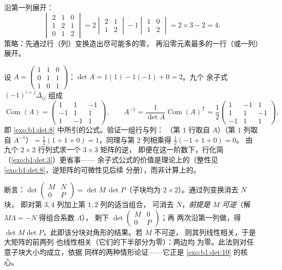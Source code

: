 \begin{example}\label{ex:b1:det:cofactor}
沿第一列展开：
\[
\begin{vmatrix}
2 & 1 & 0\\
1 & 2 & 1\\
0 & 1 & 2
\end{vmatrix}
= 2\begin{vmatrix} 2 & 1\\ 1 & 2\end{vmatrix}
- 1\begin{vmatrix} 1 & 0\\ 1 & 2\end{vmatrix}
= 2 \times 3 - 2 = 4 .
\]
策略：先通过行（列）变换造出尽可能多的零，
再沿零元素最多的一行（或一列）展开。
\end{example}

\begin{example}[手算一次余子式求逆]
\label{ex:b1:det:cofactorinverse}
设 $A = \begin{pmatrix} 1 & 1 & 0\\ 0 & 1 & 1\\ 1 & 0 &
1\end{pmatrix}$：$\det A = 1(1) - 1(-1) + 0 = 2$。九个
余子式 $(-1)^{i+j}\Delta_{ij}$ 组成
\[
\operatorname{Com}(A) = \begin{pmatrix}
1 & 1 & -1\\
-1 & 1 & 1\\
1 & -1 & 1
\end{pmatrix},
\qquad
A^{-1} = \frac{1}{\det A}\operatorname{Com}(A)^{\mathsf T}
= \frac12\begin{pmatrix}
1 & -1 & 1\\
1 & 1 & -1\\
-1 & 1 & 1
\end{pmatrix},
\]
即 \cref{exo:b1:det:8} 中所引的公式。验证一组行与列：
（第 $1$ 行取自 $A$）（第 $1$ 列取自 $A^{-1}$）$= \frac12(1 + 1
+ 0) = 1$，同理与第 $2$ 列相乘得 $\frac12(-1 + 1 + 0) = 0$。
由九个 $2\times2$ 行列式求一个 $3\times3$ 矩阵的逆，
即便在这一阶数下，行化简（\cref{exo:b1:det:3}）更省事——
余子式公式的价值是理论上的（整性见
\cref{exo:b1:det:8}，逆矩阵的可微性见后续
分册），而非计算上的。
\end{example}

\begin{example}[分块三角法则（$4$ 阶）]
\label{ex:b1:det:blocktriangular}
断言：$\det\begin{pmatrix} M & N\\ 0 & P\end{pmatrix} = \det
M\,\det P$（子块均为 $2\times2$）。通过列变换消去 $N$ 块，
即对第 $3, 4$ 列加上第 $1, 2$ 列的适当组合，
可消去 $N$，\emph{前提是 $M$ 可逆}（解
$M\Lambda = -N$ 得组合系数 $\Lambda$），
剩下 $\det\begin{pmatrix} M & 0\\ 0 & P\end{pmatrix}$；再
两次沿第一列做，得 $\det
M\det P$，此即该分块对角形的结果。若 $M$ 不可逆，
则其列线性相关，于是大矩阵的前两列
也线性相关（它们的下半部分为零）：两边均
为零。此法则对任意子块大小均成立，依据
同样的两种情形论证——它正是
\cref{exo:b1:det:10} 的核心。
\end{example}

